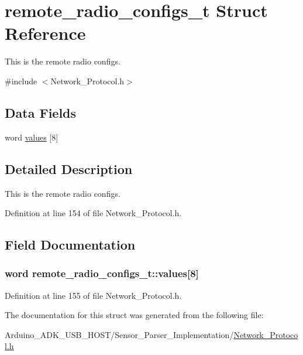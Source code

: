 \hypertarget{structremote__radio__configs__t}{\section{remote\-\_\-radio\-\_\-configs\-\_\-t Struct Reference}
\label{structremote__radio__configs__t}
}


This is the remote radio configs.  




{\ttfamily \#include $<$Network\-\_\-\-Protocol.\-h$>$}

\subsection*{Data Fields}
\begin{DoxyCompactItemize}
\item 
word \hyperlink{structremote__radio__configs__t_a19600793589b484781ae63e808e8c24f}{values} \mbox{[}8\mbox{]}
\end{DoxyCompactItemize}


\subsection{Detailed Description}
This is the remote radio configs. 

Definition at line 154 of file Network\-\_\-\-Protocol.\-h.



\subsection{Field Documentation}
\hypertarget{structremote__radio__configs__t_a19600793589b484781ae63e808e8c24f}{
\subsubsection[{values}]{\setlength{\rightskip}{0pt plus 5cm}word remote\-\_\-radio\-\_\-configs\-\_\-t\-::values\mbox{[}8\mbox{]}}}\label{structremote__radio__configs__t_a19600793589b484781ae63e808e8c24f}


Definition at line 155 of file Network\-\_\-\-Protocol.\-h.



The documentation for this struct was generated from the following file\-:\begin{DoxyCompactItemize}
\item 
Arduino\-\_\-\-A\-D\-K\-\_\-\-U\-S\-B\-\_\-\-H\-O\-S\-T/\-Sensor\-\_\-\-Parser\-\_\-\-Implementation/\hyperlink{_network___protocol_8h}{Network\-\_\-\-Protocol.\-h}\end{DoxyCompactItemize}
